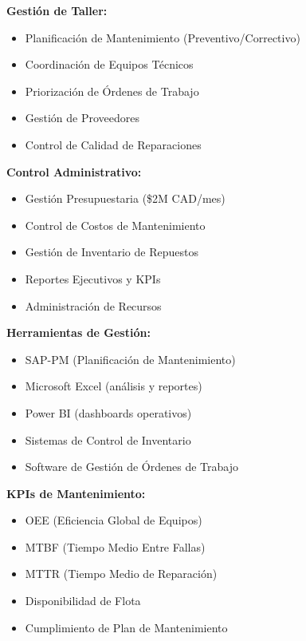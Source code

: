 \documentclass[10pt,letterpaper]{article}
\begin{document}
\vspace{0.4cm}

\vspace{0.3cm}

\noindent
\begin{minipage}[t]{0.48\textwidth}
\textbf{Gestión de Taller:}
\begin{itemize}
    \item Planificación de Mantenimiento (Preventivo/Correctivo)
    \item Coordinación de Equipos Técnicos
    \item Priorización de Órdenes de Trabajo
    \item Gestión de Proveedores
    \item Control de Calidad de Reparaciones
\end{itemize}

\vspace{0.2cm}

\textbf{Control Administrativo:}
\begin{itemize}
    \item Gestión Presupuestaria (\$2M CAD/mes)
    \item Control de Costos de Mantenimiento
    \item Gestión de Inventario de Repuestos
    \item Reportes Ejecutivos y KPIs
    \item Administración de Recursos
\end{itemize}
\end{minipage}
\hfill
\begin{minipage}[t]{0.48\textwidth}
\textbf{Herramientas de Gestión:}
\begin{itemize}
    \item SAP-PM (Planificación de Mantenimiento)
    \item Microsoft Excel (análisis y reportes)
    \item Power BI (dashboards operativos)
    \item Sistemas de Control de Inventario
    \item Software de Gestión de Órdenes de Trabajo
\end{itemize}

\vspace{0.2cm}

\textbf{KPIs de Mantenimiento:}
\begin{itemize}
    \item OEE (Eficiencia Global de Equipos)
    \item MTBF (Tiempo Medio Entre Fallas)
    \item MTTR (Tiempo Medio de Reparación)
    \item Disponibilidad de Flota
    \item Cumplimiento de Plan de Mantenimiento
\end{itemize}
\end{minipage}
\end{document}
